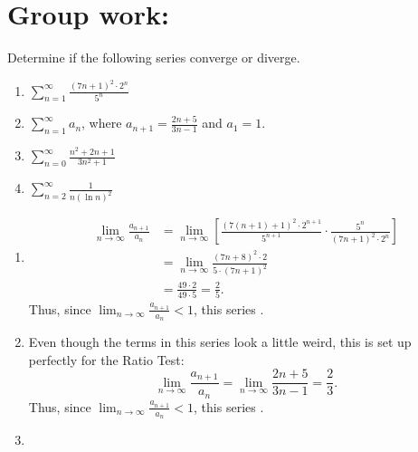 \documentclass[]{ximera}
\begin{document}
\section{Group work:}



\begin{problem}
Determine if the following series converge or diverge.
	\begin{enumerate}
	
	\item  $\sum_{n=1}^\infty \frac{(7n+1)^2 \cdot 2^n}{5^n}$
	
	\item  $\sum_{n=1}^\infty a_n$, where $a_{n+1} = \frac{2n+5}{3n-1}$ and $a_1 = 1$.
	
	\item  $\sum_{n=0}^\infty \frac{n^2 + 2n + 1}{3n^2 +1}$
	
	\item  $\sum_{n=2}^\infty \frac{1}{n(\ln n)^2}$
	
	\end{enumerate}
	
	\begin{freeResponse}
		\begin{enumerate}
	
		\item  {}
			\begin{align*}
			\lim_{n \to \infty} \frac{a_{n+1}}{a_n} 
			&= \lim_{n \to \infty} \left[ \frac{(7(n+1) + 1)^2 \cdot 2^{n+1}}{5^{n+1}} \cdot \frac{5^n}{(7n+1)^2 \cdot 2^n} \right]  \\
			&= \lim_{n \to \infty} \frac{(7n+8)^2 \cdot 2}{5 \cdot (7n+1)^2}  \\
			&= \frac{49 \cdot 2}{49 \cdot 5} = \frac{2}{5}.
			\end{align*}
		Thus, since $\lim_{n \to \infty} \frac{a_{n+1}}{a_n} < 1$, this series .  
		
		
	
		\item  {}
		
		Even though the terms in this series look a little weird, this is set up perfectly for the Ratio Test:
			\[
			\lim_{n \to \infty} \frac{a_{n+1}}{a_n} = \lim_{n \to \infty} \frac{2n+5}{3n-1} = \frac{2}{3}.
			\]
		Thus, since $\lim_{n \to \infty} \frac{a_{n+1}}{a_n} < 1$, this series .  
		
		
	
		\item  {}
		

\end{enumerate}
\end{freeResponse}
\end{problem}
\end{document}
